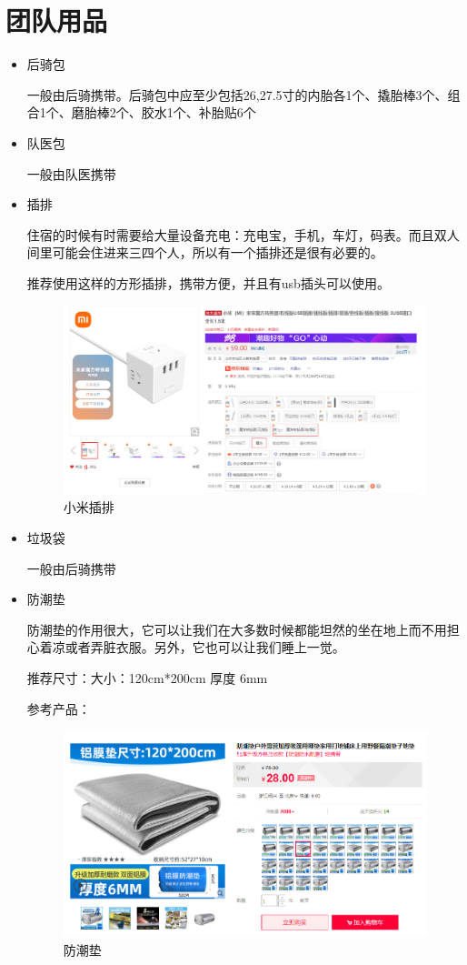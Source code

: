 \documentclass{ctexbook}
\begin{document}
    \section{团队用品} 
    \begin{itemize}
        \item 后骑包
    
        一般由后骑携带。后骑包中应至少包括26,27.5寸的内胎各1个、撬胎棒3个、组合1个、磨胎棒2个、胶水1个、补胎贴6个

        \item 队医包    
    
        一般由队医携带

        \item 插排
        
        住宿的时候有时需要给大量设备充电：充电宝，手机，车灯，码表。而且双人间里可能会住进来三四个人，所以有一个插排还是很有必要的。
        
        推荐使用这样的方形插排，携带方便，并且有usb插头可以使用。

        \begin{figure}[H]
            \centering
            \includegraphics[width=0.7\linewidth]{fig/插排}
            \caption{小米插排}
            \label{fig:}
        \end{figure}
        

        \item 垃圾袋   
    
        一般由后骑携带

        \item 防潮垫 
    
        防潮垫的作用很大，它可以让我们在大多数时候都能坦然的坐在地上而不用担心着凉或者弄脏衣服。另外，它也可以让我们睡上一觉。

        推荐尺寸：大小：120cm*200cm 厚度 6mm

        参考产品：
        \begin{figure}[H]
            \centering
            \includegraphics[width=0.7\linewidth]{fig/防潮垫}
            \caption{防潮垫}
            \label{fig:}
        \end{figure}
        


\end{itemize}
\end{document}
